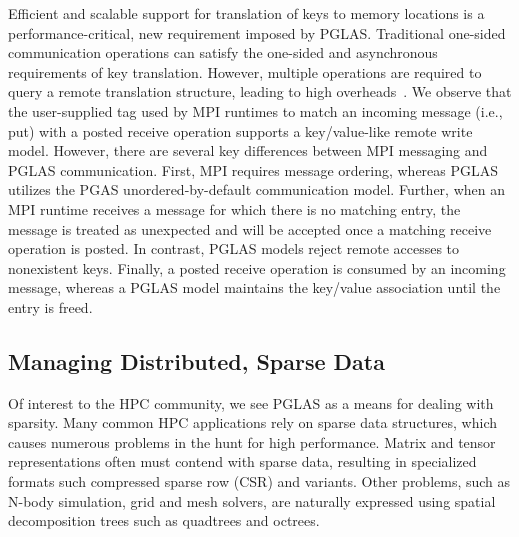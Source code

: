 Efficient and scalable support for translation of keys to memory locations is a
performance-critical, new requirement imposed by PGLAS.  Traditional one-sided
communication operations can satisfy the one-sided and asynchronous
requirements of key translation.  However, multiple operations are required to
query a remote translation structure, leading to high overheads~\cite{namashivayam:15}.  We observe
that the user-supplied tag used by MPI runtimes to match an incoming message
(i.e., put) with a posted receive operation supports a key/value-like remote
write model.
However,
there are several key differences between MPI messaging and PGLAS
communication.  First, MPI requires message ordering, whereas PGLAS utilizes
the PGAS unordered-by-default communication model.  Further, when an MPI
runtime receives a message for which there is no matching entry, the message is
treated as unexpected and will be accepted once a matching receive operation is
posted.  In contrast, PGLAS models reject remote accesses to nonexistent keys.
Finally, a posted receive operation is consumed by an incoming message, whereas
a PGLAS model maintains the key/value association until the entry is freed.

%

\subsection{Managing Distributed, Sparse Data}

Of interest to the HPC community, we see PGLAS as a
means for dealing with sparsity. Many common HPC applications rely on
sparse data structures, which causes numerous problems in the hunt for
high performance. Matrix and tensor representations often must contend
with sparse data, resulting in specialized formats such compressed
sparse row (CSR) and variants. Other problems, such as N-body
simulation, grid and mesh solvers, are naturally expressed using
spatial decomposition trees such as quadtrees and octrees. 

